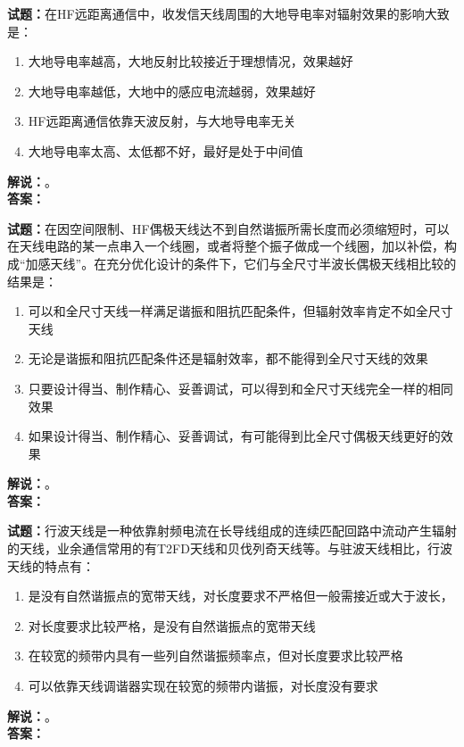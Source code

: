 \documentclass{ctexbook}
\begin{document}
\bigskip




\noindent\textbf{试题：}在HF远距离通信中，收发信天线周围的大地导电率对辐射效果的影响大致是：
\begin{enumerate}[leftmargin=3em]
\item 大地导电率越高，大地反射比较接近于理想情况，效果越好
\item 大地导电率越低，大地中的感应电流越弱，效果越好
\item HF远距离通信依靠天波反射，与大地导电率无关
\item 大地导电率太高、太低都不好，最好是处于中间值
\end{enumerate}
\noindent\textbf{解说：}\textbf{}。\\\noindent\textbf{答案：}

\bigskip




\noindent\textbf{试题：}在因空间限制、HF偶极天线达不到自然谐振所需长度而必须缩短时，可以在天线电路的某一点串入一个线圈，或者将整个振子做成一个线圈，加以补偿，构成“加感天线”。在充分优化设计的条件下，它们与全尺寸半波长偶极天线相比较的结果是：
\begin{enumerate}[leftmargin=3em]
\item 可以和全尺寸天线一样满足谐振和阻抗匹配条件，但辐射效率肯定不如全尺寸天线
\item 无论是谐振和阻抗匹配条件还是辐射效率，都不能得到全尺寸天线的效果
\item 只要设计得当、制作精心、妥善调试，可以得到和全尺寸天线完全一样的相同效果
\item 如果设计得当、制作精心、妥善调试，有可能得到比全尺寸偶极天线更好的效果
\end{enumerate}
\noindent\textbf{解说：}\textbf{}。\\\noindent\textbf{答案：}

\bigskip




\noindent\textbf{试题：}行波天线是一种依靠射频电流在长导线组成的连续匹配回路中流动产生辐射的天线，业余通信常用的有T2FD天线和贝伐列奇天线等。与驻波天线相比，行波天线的特点有：
\begin{enumerate}[leftmargin=3em]
\item 是没有自然谐振点的宽带天线，对长度要求不严格但一般需接近或大于波长，
\item 对长度要求比较严格，是没有自然谐振点的宽带天线
\item 在较宽的频带内具有一些列自然谐振频率点，但对长度要求比较严格
\item 可以依靠天线调谐器实现在较宽的频带内谐振，对长度没有要求
\end{enumerate}
\noindent\textbf{解说：}\textbf{}。\\\noindent\textbf{答案：}
\end{document}
